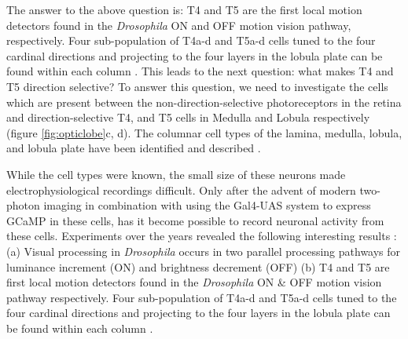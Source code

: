 The answer to the above question is: T4 and T5 are the first local motion detectors found in the \textit{Drosophila} ON and OFF motion vision pathway, respectively. Four sub-population of T4a-d and T5a-d cells tuned to the four cardinal directions and projecting to the four layers in the lobula plate can be found within each column \parencite{Maisak2013}. This leads to the next question: what makes T4 and T5 direction selective? To answer this question, we need to investigate the cells which are present between the non-direction-selective photoreceptors in the retina and direction-selective T4, and T5 cells in Medulla and Lobula respectively (figure \ref{fig:opticlobe}c, d). The columnar cell types of the lamina, medulla, lobula, and lobula plate have been identified and described \parencite{Fischbach1989, RamonyCajal1915}.  

While the cell types were known, the small size of these neurons made electrophysiological recordings difficult. Only after the advent of modern two-photon imaging in combination with using the Gal4-UAS system to express GCaMP in these cells, has it become possible to record neuronal activity from these cells. Experiments over the years revealed the following interesting results : (a) Visual processing in \textit{Drosophila} occurs in two parallel processing pathways for luminance increment (ON) and brightness decrement (OFF) \parencite{Joesch2010, Joesch2013, Strother2014, Eichner2011, Behnia2014, Shinomiya2014} (b) T4 and T5 are first local motion detectors found in the \textit{Drosophila} ON \& OFF motion vision pathway respectively. Four sub-population of T4a-d and T5a-d cells tuned to the four cardinal directions and projecting to the four layers in the lobula plate can be found within each column \parencite{Maisak2013}. 



